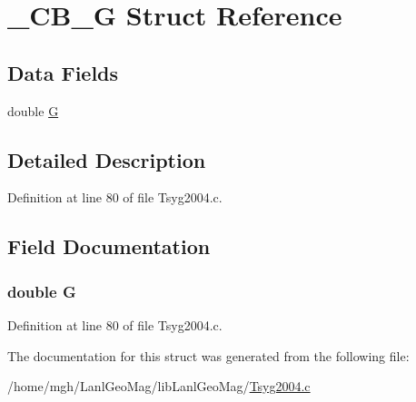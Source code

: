 \hypertarget{struct___c_b___g}{
\section{\_\-CB\_\-G Struct Reference}
\label{struct___c_b___g}
}
\subsection*{Data Fields}
\begin{CompactItemize}
\item 
double \hyperlink{struct___c_b___g_67783a2c4f670ee5a9dadcf428324d32}{G}
\end{CompactItemize}


\subsection{Detailed Description}


Definition at line 80 of file Tsyg2004.c.

\subsection{Field Documentation}
\hypertarget{struct___c_b___g_67783a2c4f670ee5a9dadcf428324d32}{
\subsubsection[{G}]{\setlength{\rightskip}{0pt plus 5cm}double {\bf G}}}
\label{struct___c_b___g_67783a2c4f670ee5a9dadcf428324d32}




Definition at line 80 of file Tsyg2004.c.

The documentation for this struct was generated from the following file:\begin{CompactItemize}
\item 
/home/mgh/LanlGeoMag/libLanlGeoMag/\hyperlink{_tsyg2004_8c}{Tsyg2004.c}\end{CompactItemize}

